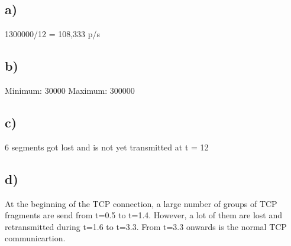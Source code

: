 \documentclass{article}
\begin{document}
\subsection*{a)}
1300000/12 = 108,333 p/s
\subsection*{b)}
Minimum: 30000
Maximum: 300000
\subsection*{c)}
6 segments got lost and is not yet transmitted at t = 12
\subsection*{d)}
At the beginning of the TCP connection, a large number of groups of TCP
fragments are send from t=0.5 to t=1.4. However, a lot of them are lost and
retransmitted during t=1.6 to t=3.3. From t=3.3 onwards is the normal TCP communicartion.
\end{document}
